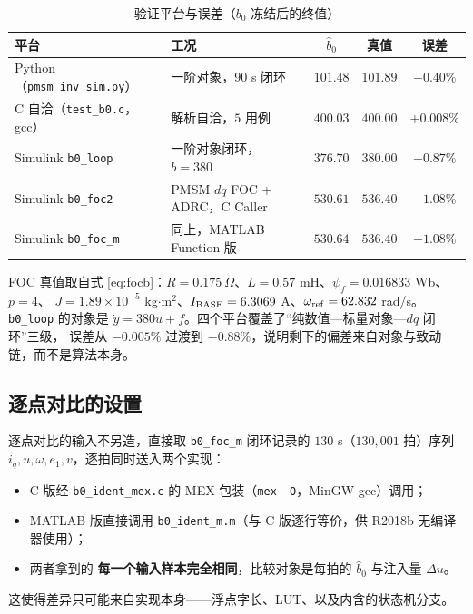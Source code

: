 \documentclass[11pt,a4paper]{ctexart}
\begin{document}
\begin{table}[H]
\centering
\caption{验证平台与误差（$b_0$ 冻结后的终值）}
\label{tab:plat}
\small
\begin{tabular}{llccc}
\toprule
平台 & 工况 & $\hat b_0$ & 真值 & 误差\\
\midrule
Python（\texttt{pmsm\_inv\_sim.py}） & 一阶对象，$90$ s 闭环 & $101.48$ & $101.89$ & $-0.40\%$\\
C 自洽（\texttt{test\_b0.c}，gcc） & 解析自洽，$5$ 用例 & $400.03$ & $400.00$ & $+0.008\%$\\
Simulink \texttt{b0\_loop} & 一阶对象闭环，$b=380$ & $376.70$ & $380.00$ & $-0.87\%$\\
Simulink \texttt{b0\_foc2} & PMSM $dq$ FOC + ADRC，C Caller & $530.61$ & $536.40$ & $\bm{-1.08\%}$\\
Simulink \texttt{b0\_foc\_m} & 同上，MATLAB Function 版 & $530.64$ & $536.40$ & $-1.08\%$\\
\bottomrule
\end{tabular}
\end{table}

FOC 真值取自式 \eqref{eq:focb}：$R=0.175\ \Omega$、$L=0.57$ mH、$\psi_f=0.016833$ Wb、$p=4$、
$J=1.89\times10^{-5}$ kg$\cdot$m$^2$、$I_{\rm BASE}=6.3069$ A、$\omega_{\rm ref}=62.832$ rad/s。
\texttt{b0\_loop} 的对象是 $\dot y=380u+f$。四个平台覆盖了“纯数值—标量对象—$dq$ 闭环”三级，
误差从 $-0.005\%$ 过渡到 $-0.88\%$，说明剩下的偏差来自对象与致动链，而不是算法本身。

\subsection{逐点对比的设置}

逐点对比的输入不另造，直接取 \texttt{b0\_foc\_m} 闭环记录的 $130$ s（$130{,}001$ 拍）序列
$i_q,u,\omega,e_1,v$，逐拍同时送入两个实现：

\begin{itemize}
\item C 版经 \texttt{b0\_ident\_mex.c} 的 MEX 包装（\texttt{mex -O}，MinGW gcc）调用；
\item MATLAB 版直接调用 \texttt{b0\_ident\_m.m}（与 C 版逐行等价，供 R2018b 无编译器使用）；
\item 两者拿到的 \textbf{每一个输入样本完全相同}，比较对象是每拍的 $\hat b_0$ 与注入量 $\Delta u$。
\end{itemize}

这使得差异只可能来自实现本身——浮点字长、LUT、以及内含的状态机分支。
\end{document}
